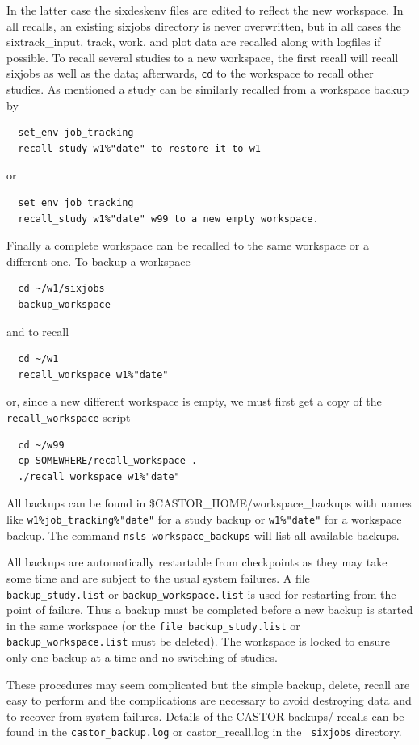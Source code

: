 \documentclass{cernatsnote}
\begin{document}
In the latter case the sixdeskenv files are edited to reflect the new
workspace. In all recalls, an existing sixjobs directory is never overwritten,
but in all cases the sixtrack\_input, track, work, and plot data are recalled
along with logfiles if possible.  To recall several studies to a new workspace,
the first recall will recall sixjobs as well as the data; afterwards, {\tt cd}
to the workspace to recall other studies.  As mentioned a study can be
similarly recalled from a workspace backup by
\begin{verbatim}
  set_env job_tracking
  recall_study w1%"date" to restore it to w1 
\end{verbatim}
or
\begin{verbatim}
  set_env job_tracking
  recall_study w1%"date" w99 to a new empty workspace.
\end{verbatim}
Finally a complete workspace can be recalled to the same workspace or a
different one.  To backup a workspace
\begin{verbatim}
  cd ~/w1/sixjobs
  backup_workspace
\end{verbatim}
and to recall
\begin{verbatim}
  cd ~/w1
  recall_workspace w1%"date"
\end{verbatim}
or, since a new different workspace is empty, we must first get a copy of the
{\tt recall\_workspace} script
\begin{verbatim}
  cd ~/w99
  cp SOMEWHERE/recall_workspace .
  ./recall_workspace w1%"date"
\end{verbatim}

All backups can be found in \$CASTOR\_HOME/workspace\_backups with names like
{\tt w1\%job\_tracking\%"date"} for a study backup or {\tt w1\%"date"} for a
workspace backup.  The command {\tt nsls workspace\_backups} will list all
available backups.

All backups are automatically restartable from checkpoints as they may take
some time and are subject to the usual system failures. A file {\tt
backup\_study.list} or {\tt backup\_workspace.list} is used for restarting from
the point of failure. Thus a backup must be completed before a new backup is
started in the same workspace (or the {\tt file backup\_study.list} or {\tt
backup\_workspace.list} must be deleted). The workspace is locked to ensure
only one backup at a time and no switching of studies.

These procedures may seem complicated but the simple backup, delete, recall are
easy to perform and the complications are necessary to avoid destroying data
and to recover from system failures. Details of the CASTOR backups/ recalls can
be found in the {\tt castor\_backup.log} or {castor\_recall.log} in the {\tt
sixjobs} directory.
\end{document}
